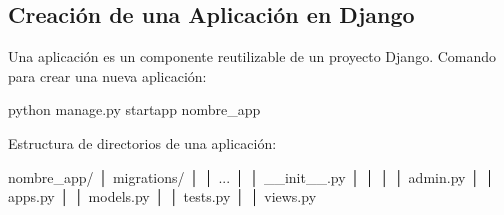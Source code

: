 \documentclass[
  letterpaper,
  DIV=11,
  numbers=noendperiod]{scrartcl}
\newenvironment{Shaded}{\begin{snugshade}}{\end{snugshade}}
\newcommand{\ExtensionTok}[1]{\textcolor[rgb]{0.00,0.23,0.31}{#1}}
\newcommand{\NormalTok}[1]{\textcolor[rgb]{0.00,0.23,0.31}{#1}}
\begin{document}
\hypertarget{creaciuxf3n-de-una-aplicaciuxf3n-en-django}{%
\subsection{Creación de una Aplicación en
Django}\label{creaciuxf3n-de-una-aplicaciuxf3n-en-django}}

Una aplicación es un componente reutilizable de un proyecto Django.
Comando para crear una nueva aplicación:

\begin{Shaded}
\begin{Highlighting}[]
\ExtensionTok{python}\NormalTok{ manage.py startapp nombre\_app}
\end{Highlighting}
\end{Shaded}

Estructura de directorios de una aplicación:

\begin{Shaded}
\begin{Highlighting}[]
\NormalTok{nombre\_app/}
\NormalTok{│   migrations/}
\NormalTok{│   │   ...}
\NormalTok{│   │   \_\_init\_\_.py}
\NormalTok{│   │}
\NormalTok{│   │   admin.py}
\NormalTok{│   │   apps.py}
\NormalTok{│   │   models.py}
\NormalTok{│   │   tests.py}
\NormalTok{│   │   views.py}
\end{Highlighting}
\end{Shaded}
\end{document}
